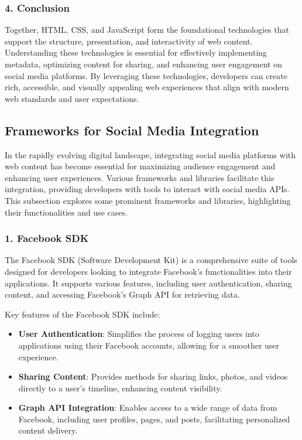 \subsubsection{4. Conclusion}

Together, HTML, CSS, and JavaScript form the foundational technologies that support the structure, presentation, and interactivity of web content. Understanding these technologies is essential for effectively implementing metadata, optimizing content for sharing, and enhancing user engagement on social media platforms. By leveraging these technologies, developers can create rich, accessible, and visually appealing web experiences that align with modern web standards and user expectations.

\subsection{Frameworks for Social Media Integration}
\label{subsec:frameworks_for_social_media_integration}

In the rapidly evolving digital landscape, integrating social media platforms with web content has become essential for maximizing audience engagement and enhancing user experiences. Various frameworks and libraries facilitate this integration, providing developers with tools to interact with social media APIs. This subsection explores some prominent frameworks and libraries, highlighting their functionalities and use cases.

\subsubsection{1. Facebook SDK}

The Facebook SDK (Software Development Kit) is a comprehensive suite of tools designed for developers looking to integrate Facebook's functionalities into their applications. It supports various features, including user authentication, sharing content, and accessing Facebook's Graph API \cite{facebook_api_documentation} for retrieving data.

Key features of the Facebook SDK include:
\begin{itemize}
    \item \textbf{User Authentication}: Simplifies the process of logging users into applications using their Facebook accounts, allowing for a smoother user experience.
    \item \textbf{Sharing Content}: Provides methods for sharing links, photos, and videos directly to a user's timeline, enhancing content visibility.
    \item \textbf{Graph API Integration}: Enables access to a wide range of data from Facebook, including user profiles, pages, and posts, facilitating personalized content delivery.
\end{itemize}


